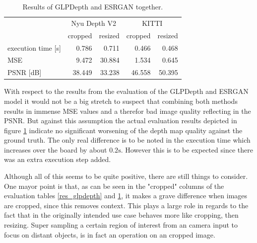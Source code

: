\begin{table}[ht!]
    \begin{center}
        \begin{tabular}{ l | r r r r }
                                & \multicolumn{2}{c}{Nyu Depth V2}  & \multicolumn{2}{c}{KITTI} \\
                                & cropped   & resized               & cropped   & resized       \\
            \hline
            execution time [s]  & 0.786     & 0.711                 & 0.466     & 0.468         \\
            MSE                 & 9.472     & 30.884                & 1.534     & 0.645         \\
            PSNR [dB]           & 38.449    & 33.238                & 46.558    & 50.395        \\
        \end{tabular}
        \caption{Results of GLPDepth and ESRGAN together.} \label{res_general}
    \end{center}
\end{table}

With respect to the results from the evaluation of the GLPDepth and ESRGAN model it would not be a big stretch to suspect that combining both methods results in immense MSE values and a therefor bad image quality reflecting in the PSNR. But against this assumption the actual evaluation results depicted in figure \ref*{res_general} indicate no significant worsening of the depth map quality against the ground truth.
The only real difference is to be noted in the execution time which increases over the board by about $0.2\mathrm{s}$. However this is to be expected since there was an extra execution step added.

Although all of this seems to be quite positive, there are still things to consider. One mayor point is that, as can be seen in the "cropped" columns of the evaluation tables \ref*{res_glpdepth} and \ref*{res_general}, it makes a grave difference when images are cropped, since this removes context. This plays a large role in regards to the fact that in the originally intended use case behaves more like cropping, then resizing. Super sampling a certain region of interest from an camera input to focus on distant objects, is in fact an operation on an cropped image.

